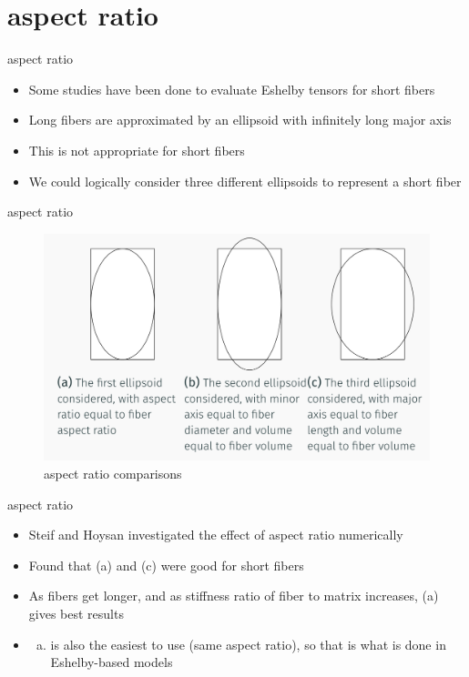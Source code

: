 \documentclass[
  letterpaper,
  ignorenonframetext,
  aspectratio=43,
  handout,
  12pt]{beamer}
\providecommand{\tightlist}{%
  \setlength{\itemsep}{0pt}\setlength{\parskip}{0pt}}
\providecommand{\tightlist}{%
\setlength{\itemsep}{0pt}\setlength{\parskip}{0pt}}
\let\Oldincludegraphics\includegraphics
\renewcommand{\includegraphics}[2][]{\Oldincludegraphics[width=\textwidth,height=0.7\textheight,keepaspectratio]{#2}}
\begin{document}
\hypertarget{aspect-ratio}{%
\section{aspect ratio}\label{aspect-ratio}}

\begin{frame}{aspect ratio}
\protect\hypertarget{aspect-ratio-1}{}
\begin{itemize}
\tightlist
\item
  Some studies have been done to evaluate Eshelby tensors for short
  fibers
\item
  Long fibers are approximated by an ellipsoid with infinitely long
  major axis
\item
  This is not appropriate for short fibers
\item
  We could logically consider three different ellipsoids to represent a
  short fiber
\end{itemize}
\end{frame}

\begin{frame}{aspect ratio}
\protect\hypertarget{aspect-ratio-2}{}
\begin{figure}
\centering
\includegraphics{../images/ellipsoids.PNG}
\caption{aspect ratio comparisons}
\end{figure}
\end{frame}

\begin{frame}{aspect ratio}
\protect\hypertarget{aspect-ratio-3}{}
\begin{itemize}
\item
  Steif and Hoysan investigated the effect of aspect ratio numerically
\item
  Found that (a) and (c) were good for short fibers
\item
  As fibers get longer, and as stiffness ratio of fiber to matrix
  increases, (a) gives best results
\item
  \begin{enumerate}
  [(a)]
  \tightlist
  \item
    is also the easiest to use (same aspect ratio), so that is what is
    done in Eshelby-based models
  \end{enumerate}
\end{itemize}
\end{frame}
\end{document}
